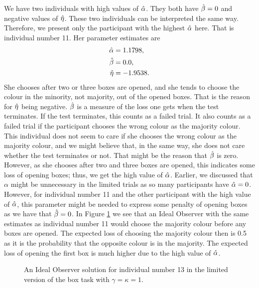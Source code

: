 We have two individuals with high values of $\hat{\alpha}$. They both have $\hat{\beta}=0$ and negative values of $\hat{\eta}$. These two individuals can be interpreted the same way. Therefore, we present only the participant with the highest $\hat{\alpha}$ here. That is individual number 11. Her parameter estimates are
\begin{equation}
\label{mles_lim_person11}
    \begin{aligned}
        \hat{\alpha} &= 1.1798,\\
        \hat{\beta} &= 0.0,\\
        \hat{\eta} &= -1.9538.
    \end{aligned}
\end{equation}
She chooses after two or three boxes are opened, and she tends to choose the colour in the minority, not majority, out of the opened boxes. That is the reason for $\hat{\eta}$ being negative. $\hat{\beta}$ is a measure of the loss one gets when the test terminates. If the test terminates, this counts as a failed trial. It also counts as a failed trial if the participant chooses the wrong colour as the majority colour. This individual does not seem to care if she chooses the wrong colour as the majority colour, and we might believe that, in the same way, she does not care whether the test terminates or not. That might be the reason that $\hat{\beta}$ is zero. However, as she chooses after two and three boxes are opened, this indicates some loss of opening boxes; thus, we get the high value of $\hat{\alpha}$. 
Earlier, we discussed that $\alpha$ might be unnecessary in the limited trials as so many participants have $\hat{\alpha}=0$. However, for individual number 11 and the other participant with the high value of $\hat{\alpha}$, this parameter might be needed to express some penalty of opening boxes as we have that $\hat{\beta}=0$.
In Figure \ref{fig:IO_sol_person11_limited_gk1} we see that an Ideal Observer with the same estimates as individual number 11 would choose the majority colour before any boxes are opened. The expected loss of choosing the majority colour then is 0.5 as it is the probability that the opposite colour is in the majority. The expected loss of opening the first box is much higher due to the high value of $\hat{\alpha}$. 
\begin{figure}
    \centering
    \scalebox{0.7}{}
    \caption[Ideal Observer solution individual 11, limited. $\gamma=\kappa=1$]{An Ideal Observer solution for individual number 13 in the limited version of the box task with $\gamma=\kappa=1$.}
    \label{fig:IO_sol_person11_limited_gk1}
\end{figure}


